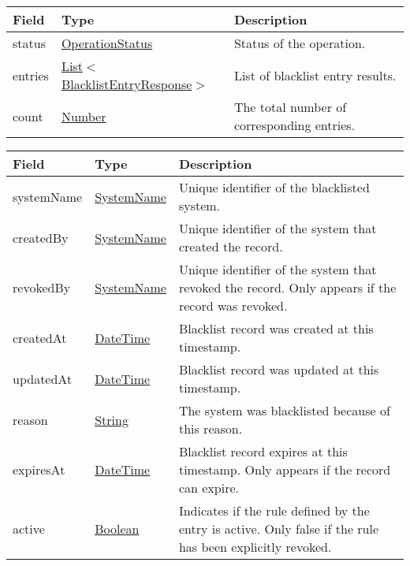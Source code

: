 \documentclass[a4paper]{arrowhead}
\newcommand{\pref}[1]{{\textcolor{ArrowheadGrey}{\hyperref[sec:model:primitives:#1]{#1}}}}
\begin{document}
 
\begin{table}[ht!]
\begin{tabularx}{\textwidth}{| p{4.25cm} | p{5cm} | X |} \hline
\rowcolor{gray!33} Field & Type      & Description \\ \hline
status & \pref{OperationStatus} & Status of the operation. \\ \hline
entries & \pref{List}$<$\hyperref[sec:model:BlacklistEntryResponse]{BlacklistEntryResponse}$>$ & List of blacklist entry results. \\ \hline
count & \pref{Number} & The total number of corresponding entries. \\ \hline
\end{tabularx}
\end{table}


\begin{table}[ht!]
\begin{tabularx}{\textwidth}{| p{4.25cm} | p{3.5cm} | X |} \hline
\rowcolor{gray!33} Field & Type      & Description \\ \hline
systemName & \pref{SystemName} & Unique identifier of the blacklisted system. \\ \hline
createdBy & \pref{SystemName} & Unique identifier of the system that created the record. \\ \hline
revokedBy & \pref{SystemName} & Unique identifier of the system that revoked the record. Only appears if the record was revoked. \\ \hline
createdAt & \pref{DateTime} & Blacklist record was created at this timestamp. \\ \hline
updatedAt & \pref{DateTime} & Blacklist record was updated at this timestamp. \\ \hline
reason & \pref{String} & The system was blacklisted because of this reason. \\ \hline
expiresAt & \pref{DateTime} & Blacklist record expires at this timestamp. Only appears if the record can expire. \\ \hline
active & \pref{Boolean} & Indicates if the rule defined by the entry is active. Only false if the rule has been explicitly revoked. \\ \hline

\end{tabularx}
\end{table}
\end{document}
